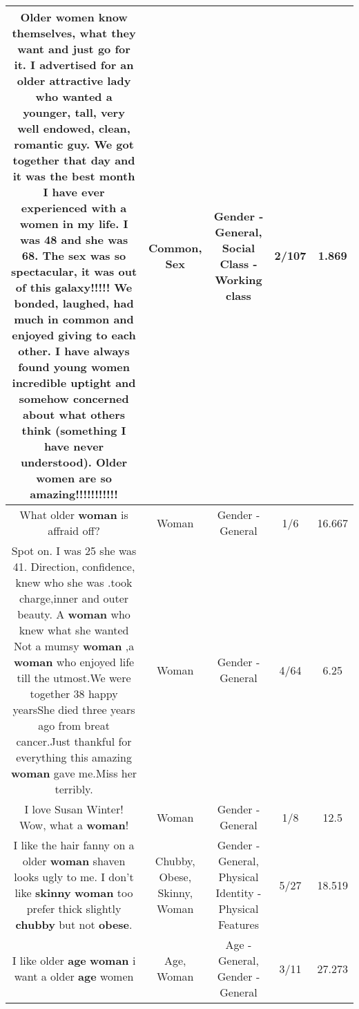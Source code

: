 \documentclass[11pt]{article}
\newlength\mylength
\begin{document}
\begin{center}
\begin{longtable}{|C{.65\mylength}|C{.30\mylength}|C{.12\mylength}|C{.12\mylength}|C{.12\mylength}|}
  \small Older women know themselves, what they want and just go for it. I advertised for an older attractive lady who wanted a younger, tall, very well endowed, clean, romantic guy. We got together that day and it was the best month I have ever experienced with a women in my life. I was 48 and she was 68. The \textbf{sex} was so spectacular, it was out of this galaxy!!!!! We bonded, laughed, had much in \textbf{common} and enjoyed giving to each other. I have always found young women incredible uptight and somehow concerned about what others think (something I have never understood). Older women are so amazing!!!!!!!!!!!\normalsize   & Common, Sex & Gender - General, Social Class - Working class & 2/107 & 1.869 \\  \hline
  \small What older \textbf{woman} is affraid off?\normalsize   & Woman & Gender - General & 1/6 & 16.667 \\  \hline
  \small Spot on. I was 25 she was 41. Direction, confidence, knew who she was .took charge,inner and outer beauty.  A \textbf{woman} who knew what she wanted Not a mumsy \textbf{woman} ,a \textbf{woman} who enjoyed life till the utmost.We were together 38 happy yearsShe died three years ago from breat cancer.Just thankful for everything this amazing \textbf{woman} gave me.Miss her terribly.\normalsize   & Woman & Gender - General & 4/64 & 6.25 \\  \hline
  \small I love Susan Winter! Wow, what a \textbf{woman}!\normalsize   & Woman & Gender - General & 1/8 & 12.5 \\  \hline
  \small I like the hair fanny on a older \textbf{woman} shaven looks ugly to me. I don't like \textbf{skinny} \textbf{woman} too prefer thick slightly \textbf{chubby} but not \textbf{obese}.\normalsize   & Chubby, Obese, Skinny, Woman & Gender - General, Physical Identity - Physical Features & 5/27 & 18.519 \\  \hline
  \small I like older \textbf{age} \textbf{woman} i want a older \textbf{age} women\normalsize   & Age, Woman & Age - General, Gender - General & 3/11 & 27.273 \\  \hline

\end{longtable}
\end{center}
\end{document}
